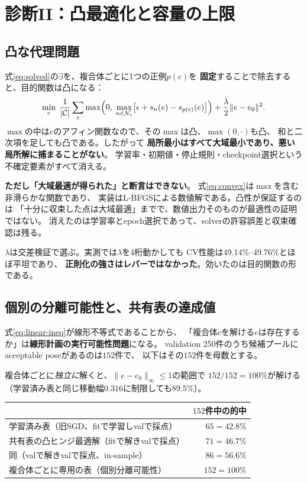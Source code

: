 \documentclass[11pt,a4paper]{article}
\begin{document}
\section{診断II：凸最適化と容量の上限}

\subsection{凸な代理問題}

式\eqref{eq:solved}の$\exists$を、複合体ごとに1つの正例$p(c)$を
\textbf{固定}することで除去すると、目的関数は凸になる：
\begin{equation}
  \min_{e}\;
  \frac{1}{|\mathcal{C}|}\sum_{c}
  \max\Bigl(0,\; \max_{n \in \mathcal{N}_c}\bigl[\epsilon + s_n(e) - s_{p(c)}(e)\bigr]\Bigr)
  + \frac{\lambda}{2}\|e - e_0\|^2 .
  \label{eq:convex}
\end{equation}
$\max$の中は$e$のアフィン関数なので、その$\max$は凸、$\max(0,\cdot)$も凸、
和と二次項を足しても凸である。したがって
\textbf{局所最小はすべて大域最小であり、悪い局所解に捕まることがない}。
学習率・初期値・停止規則・checkpoint選択という不確定要素がすべて消える。

\textbf{ただし「大域最適が得られた」と断言はできない}。
式\eqref{eq:convex}は$\max$を含む非滑らかな関数であり、
実装はL-BFGSによる数値解である。凸性が保証するのは
「十分に収束した点は大域最適」までで、数値出力そのものが最適性の証明ではない。
消えたのは学習率とepoch選択であって、solverの許容誤差と収束確認は残る。

$\lambda$は交差検証で選ぶ。実測では$\lambda$を4桁動かしても
CV性能は$49.14\%$--$49.76\%$とほぼ平坦であり、
\textbf{正則化の強さはレバーではなかった}。効いたのは目的関数の形である。

\subsection{個別の分離可能性と、共有表の達成値}

式\eqref{eq:linear-ineq}が線形不等式であることから、
「複合体$c$を解ける$e$は存在するか」は\textbf{線形計画の実行可能性問題}になる。
validation 250件のうち候補プールにacceptable poseがあるのは$152$件で、
以下はその$152$件を母数とする。

複合体ごとに\emph{独立に}解くと、$\|e-e_0\|_\infty \le 1$の範囲で
$152/152 = 100\%$が解ける（学習済み表と同じ移動幅$0.316$に制限しても$89.5\%$）。

\begin{center}
\begin{tabular}{lr}
\toprule
 & $152$件中の的中 \\
\midrule
学習済み表（旧SGD、fitで学習しvalで採点） & $65 = 42.8\%$ \\
共有表の凸ヒンジ最適解（fitで解きvalで採点） & $71 = 46.7\%$ \\
同（valで解きvalで採点、in-sample） & $86 = 56.6\%$ \\
複合体ごとに専用の表（個別分離可能性） & $152 = 100\%$ \\
\bottomrule
\end{tabular}
\end{center}
\end{document}
